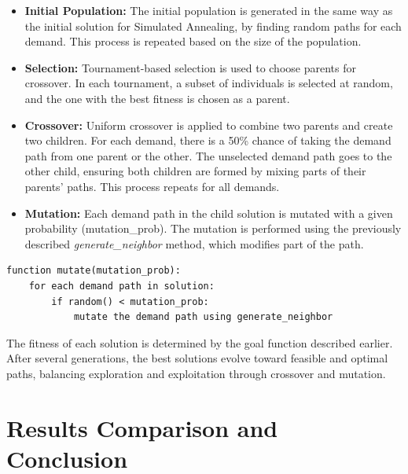 \documentclass[a4paper,12pt]{article}
\begin{document}
\begin{itemize}
    \item \textbf{Initial Population:} The initial population is generated in the same way as the initial solution for Simulated Annealing, by finding random paths for each demand. This process is repeated based on the size of the population.
    
    \item \textbf{Selection:} Tournament-based selection is used to choose parents for crossover. In each tournament, a subset of individuals is selected at random, and the one with the best fitness is chosen as a parent.
    
    \item \textbf{Crossover:} Uniform crossover is applied to combine two parents and create two children. For each demand, there is a 50\% chance of taking the demand path from one parent or the other. The unselected demand path goes to the other child, ensuring both children are formed by mixing parts of their parents' paths. This process repeats for all demands.

    \item \textbf{Mutation:} Each demand path in the child solution is mutated with a given probability (mutation\_prob). The mutation is performed using the previously described \textit{generate\_neighbor} method, which modifies part of the path.
\end{itemize}

\begin{verbatim}
function mutate(mutation_prob):
    for each demand path in solution:
        if random() < mutation_prob:
            mutate the demand path using generate_neighbor
\end{verbatim}

\noindent The fitness of each solution is determined by the goal function described earlier. After several generations, the best solutions evolve toward feasible and optimal paths, balancing exploration and exploitation through crossover and mutation.


\section{Results Comparison and Conclusion}\
\end{document}
